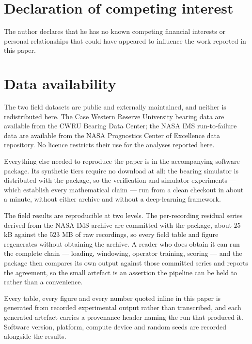 \documentclass[a4paper]{cas-sc}
\begin{document}
\printcredits

\section*{Declaration of competing interest}

The author declares that he has no known competing financial interests or
personal relationships that could have appeared to influence the work reported
in this paper.

\section*{Data availability}

The two field datasets are public and externally maintained, and neither is
redistributed here. The Case Western Reserve University bearing data are
available from the CWRU Bearing Data Center; the NASA IMS run-to-failure data
are available from the NASA Prognostics Center of Excellence data repository.
No licence restricts their use for the analyses reported here.

Everything else needed to reproduce the paper is in the accompanying software
package. Its synthetic tiers require no download at all: the bearing simulator
is distributed with the package, so the verification and simulator experiments
--- which establish every mathematical claim --- run from a clean checkout in
about a minute, without either archive and without a deep-learning framework.

The field results are reproducible at two levels. The per-recording residual
series derived from the NASA IMS archive are committed with the package, about
\(25\) kB against the \(523\) MB of raw recordings, so every field table and
figure regenerates without obtaining the archive. A reader who does obtain it
can run the complete chain --- loading, windowing, operator training, scoring
--- and the package then compares its own output against those committed series
and reports the agreement, so the small artefact is an assertion the pipeline
can be held to rather than a convenience.

Every table, every figure and every number quoted inline in this paper is
generated from recorded experimental output rather than transcribed, and each
generated artefact carries a provenance header naming the run that produced
it. Software version, platform, compute device and random seeds are recorded
alongside the results.



\end{document}
